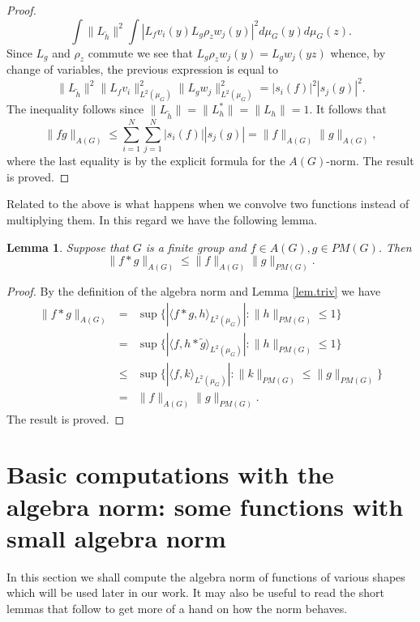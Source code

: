 \documentclass[12pt]{amsart}
\numberwithin{equation}{section}
\theoremstyle{plain}
\newtheorem{lemma}[subsection]{Lemma}
\theoremstyle{definition}
\renewcommand{\leq}{\leqslant}
\begin{document}
\begin{proof}
\begin{equation*}
\int{\|L_{\tilde{h}}\|^2 \int{|L_fv_i(y)L_g\rho_zw_j(y)|^2d\mu_G(y)}d\mu_G(z)}.
\end{equation*}
Since $L_g$ and $\rho_z$ commute we see that $L_g\rho_zw_j(y)=L_gw_j(yz)$ whence, by change of variables, the previous expression is equal to
\begin{equation*}
\|L_{\tilde{h}}\|^2\|L_fv_i\|_{L^2(\mu_G)}^2\|L_gw_j\|_{L^2(\mu_G)}^2 = |s_i(f)|^2|s_j(g)|^2.
\end{equation*}
The inequality follows since $\|L_{\tilde{h}}\| = \|L_h^*\| =\|L_h\|=1$.  It follows that
\begin{equation*}
\|fg\|_{A(G)} \leq \sum_{i=1}^N{\sum_{j=1}^N{|s_i(f)||s_j(g)|}} = \|f\|_{A(G)}\|g\|_{A(G)},
\end{equation*}
where the last equality is by the explicit formula for the $A(G)$-norm.  The result is proved.
\end{proof}
Related to the above is what happens when we convolve two functions instead of multiplying them.  In this regard we have the following lemma.
 \begin{lemma}\label{lem.a-ap}
 Suppose that $G$ is a finite group and $f\in A(G), g \in PM(G)$. Then
 \begin{equation*}
 \|f \ast g\|_{A(G)} \leq \|f\|_{A(G)}\|g\|_{PM(G)}.
 \end{equation*}
 \end{lemma}
 \begin{proof}
 By the definition of the algebra norm and Lemma \ref{lem.triv} we have
 \begin{eqnarray*}
 \|f \ast g\|_{A(G)} & = & \sup\{|\langle f \ast g,h\rangle_{L^2(\mu_G)}|: \|h\|_{PM(G)}\leq 1\}\\ & = &  \sup\{|\langle f,h\ast \tilde{g} \rangle_{L^2(\mu_G)}|: \|h\|_{PM(G)}\leq 1\}\\ & \leq &   \sup\{|\langle f,k\rangle_{L^2(\mu_G)}|: \|k\|_{PM(G)}\leq \|g\|_{PM(G)}\}\\ & =& \|f\|_{A(G)}\|g\|_{PM(G)}.
 \end{eqnarray*}
The result is proved.
 \end{proof}
 
 \section{Basic computations with the algebra norm: some functions with small algebra norm}\label{sec.algfunc}
 
In this section we shall compute the algebra norm of functions of various shapes which will be used later in our work.  It may also be useful to read the short lemmas that follow to get more of a hand on how the norm behaves.
\end{document}
